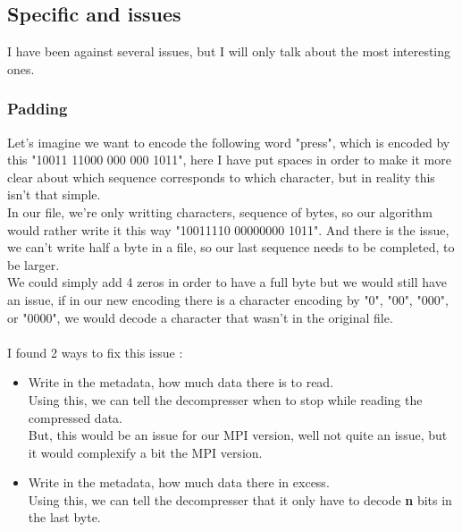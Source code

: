 \subsection{Specific and issues}
I have been against several issues, but I will only talk about the most interesting ones.

\subsubsection{Padding}
Let's imagine we want to encode the following word "press", which is encoded by this "10011 11000 000 000 1011", here I have put spaces in order to make it more clear about which sequence corresponds to which character, but in reality this isn't that simple.\\
In our file, we're only writting characters, sequence of bytes, so our algorithm would rather write it this way "10011110 00000000 1011". And there is the issue, we can't write half a byte in a file, so our last sequence needs to be completed, to be larger.\\
We could simply add 4 zeros in order to have a full byte but we would still have an issue, if in our new encoding there is a character encoding by "0", "00", "000", or "0000", we would decode a character that wasn't in the original file.\\
\\
I found 2 ways to fix this issue :
\begin{itemize}
\item Write in the metadata, how much data there is to read.\\
Using this, we can tell the decompresser when to stop while reading the compressed data.\\
But, this would be an issue for our MPI version, well not quite an issue, but it would complexify a bit the MPI version.
\item Write in the metadata, how much data there in excess.\\
Using this, we can tell the decompresser that it only have to decode \textbf{n} bits in the last byte.
\end{itemize}